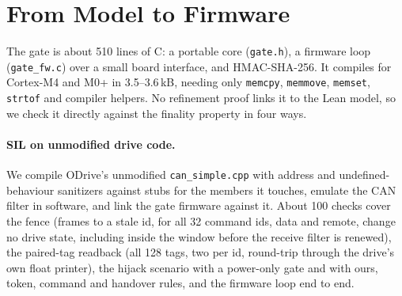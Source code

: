\documentclass[letterpaper]{article} %
\newcommand{\code}[1]{\texttt{#1}}
\begin{document}
\section{From Model to Firmware}
\label{sec:firmware}

The gate is about 510 lines of C: a portable core (\code{gate.h}), a firmware loop
(\code{gate\_fw.c}) over a small board interface, and HMAC-SHA-256. It compiles for Cortex-M4
and M0+ in 3.5--3.6\,kB, needing only \code{memcpy}, \code{memmove}, \code{memset},
\code{strtof} and compiler helpers.
No refinement proof links it to the Lean model, so we check it directly against the finality
property in four ways.

\paragraph{SIL on unmodified drive code.} We compile ODrive's unmodified \code{can\_simple.cpp}
\citep{odrive} with address and undefined-behaviour sanitizers against stubs for the members it
touches, emulate the CAN filter in software, and link the gate firmware against it. About 100
checks cover the fence (frames to a stale id, for all 32 command ids, data and remote, change
no drive state, including inside the window before the receive filter is renewed), the paired-tag readback
(all 128 tags, two per id, round-trip through the drive's own float printer), the hijack scenario with a
power-only gate and with ours, token, command and handover rules, and the firmware loop end to end.
\end{document}
